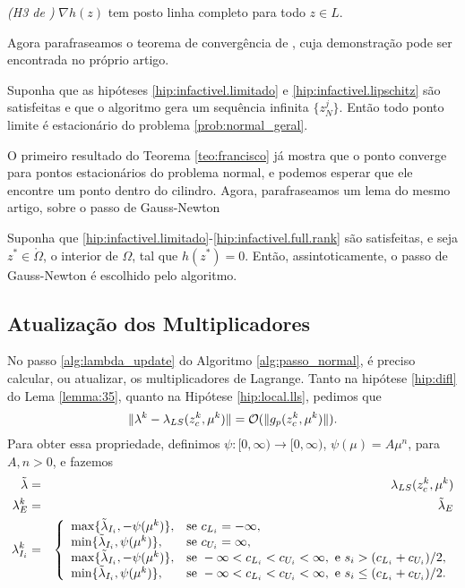\begin{hypoenv}
  \emph{(H3 de \cite{bib:francisco})}
  $\nabla h(z)$ tem posto linha completo para todo $z\in L$.
\end{hypoenv}
Agora parafraseamos o teorema de convergência de \cite{bib:francisco}, cuja
demonstração pode ser encontrada no próprio artigo.
\begin{theorem}
  Suponha que as hipóteses \ref{hip:infactivel.limitado} e \ref{hip:infactivel.lipschitz} são
  satisfeitas e que o algoritmo gera um sequência infinita $\{z_N^j\}$. Então
  todo ponto limite é estacionário do problema \eqref{prob:normal_geral}.
\end{theorem}
O primeiro resultado do Teorema \ref{teo:francisco} já mostra que o ponto
converge para pontos estacionários do problema normal, e podemos esperar que ele
encontre um ponto dentro do cilindro. 
Agora, parafraseamos um lema do mesmo artigo, sobre o passo de Gauss-Newton
\begin{lemma}
  Suponha que \ref{hip:infactivel.limitado}-\ref{hip:infactivel.full.rank} são
  satisfeitas, e seja $z^*\in\mathring{\Omega}$, o interior de $\Omega$, tal que
  $h(z^*) = 0$. Então, assintoticamente, o passo de Gauss-Newton é escolhido
  pelo algoritmo.
\end{lemma}

\subsection{Atualização dos Multiplicadores}

No passo \ref{alg:lambda_update} do Algoritmo \ref{alg:passo_normal}, é preciso
calcular, ou atualizar, os multiplicadores de Lagrange. Tanto na hipótese
\ref{hip:difl} do Lema \ref{lemma:35}, quanto na Hipótese \ref{hip:local.lls},
pedimos que
$$\Vert \lambda^k - \lambda_{LS}(z_c^{k}, \mu^{k})\Vert = \mathcal{O}(\Vert g_p(z_c^{k}, \mu^{k})\Vert).$$
Para obter essa propriedade, definimos $\psi:[0,\infty)\rightarrow [0,\infty)$,
$\psi(\mu) = A\mu^n$, para $A,n > 0$, e fazemos
\begin{eqnarray*}
\tilde{\lambda} & = & \lambda_{LS}(z_c^{k},\mu^{k}) \\
\lambda^k_E & = & \tilde{\lambda}_E \\
\lambda^k_{I_i} & = & \left\{
\begin{array}{ll}
\max \{\tilde{\lambda}_{I_i}, -\psi(\mu^{k})\}, & \mbox{se } c_{L_i} = -\infty, \\
\min \{\tilde{\lambda}_{I_i}, \psi(\mu^{k})\}, & \mbox{se } c_{U_i} = \infty, \\
  \max \{\tilde{\lambda}_{I_i}, -\psi(\mu^{k})\}, & 
  \mbox{se } -\infty < c_{L_i} < c_{U_i} < \infty, \mbox{ e }
  s_i > (c_{L_i} + c_{U_i})/2, \\
\min \{\tilde{\lambda}_{I_i}, \psi(\mu^{k})\}, & 
  \mbox{se } -\infty < c_{L_i} < c_{U_i} < \infty, \mbox{ e }
s_i \leq (c_{L_i} + c_{U_i})/2.
\end{array}
\right.
\end{eqnarray*}

